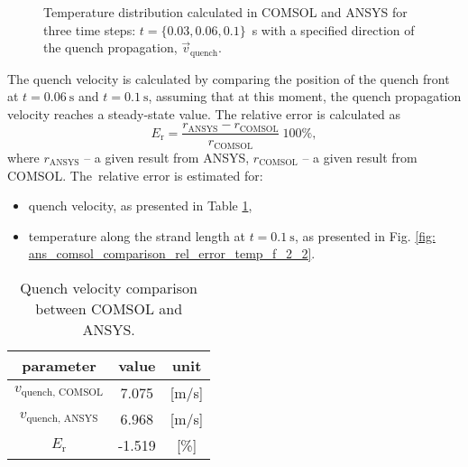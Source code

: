 \begin{figure}[H]
    \caption{Temperature distribution calculated in COMSOL and ANSYS for three time steps: $t=\{0.03, 0.06, 0.1\}$~s with a specified direction of the quench propagation, $\vec{v}_\text{quench}$.}
    \label{fig: 1d_no_insulation_temp_along_strand_comparison}
\end{figure}

The quench velocity is calculated by comparing the position of the quench front at $t=0.06~\text{s}$ and $t=0.1~\text{s}$, assuming that at this moment, the quench propagation velocity reaches a steady-state value. The relative error is calculated as
\begin{equation}
    E_\text{r} = \frac{r_\text{ANSYS}-r_\text{COMSOL}}{r_\text{COMSOL}}~100\%,
    \label{eqn:relative_error_comsol_ansys_benchmarking}
\end{equation}
where $r_\text{ANSYS}$ -- a given result from ANSYS, $r_\text{COMSOL}$ -- a given result from COMSOL. The~relative error is estimated for:

\begin{itemize}
    \item quench velocity, as presented in Table \ref{table: 1d_no_insulation_v_quench_comparison},
    \item temperature along the strand length at $t=0.1~\text{s}$, as presented in Fig. \ref{fig: ans_comsol_comparison_rel_error_temp_f_2_2}.
\end{itemize}

\begin{table}[H]
    \caption{Quench velocity comparison between COMSOL and ANSYS.} 
    \vspace{-1.em} 
    \fontsize{10}{10}
    \selectfont 
    \renewcommand{\arraystretch}{1.5}
    \begin{center}
        \begin{tabular}{ ccc }  
        \hline
        parameter & value & unit \\
        \hline
        $v_\text{quench, COMSOL}$ & 7.075 & [m/s] \\
        $v_\text{quench, ANSYS}$ & 6.968 & [m/s] \\
        $E_\text{r}$ & -1.519 & [\%] \\
        \hline 
        \end{tabular}
    \end{center}  
     \label{table: 1d_no_insulation_v_quench_comparison} 
 \end{table}

